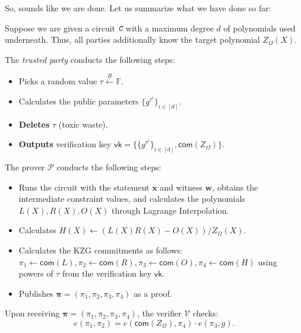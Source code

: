 \documentclass[../lecture-notes.tex]{subfiles}
\begin{document}
So, sounds like we are done. Let us summarize what we have done so far:
\begin{tcolorbox}[title=Attempt \#1 zk-SNARK Protocol,
    colback=blue!5!white,
    colframe=blue!75!black,
    colbacktitle=blue!25!white,
    coltitle=blue!20!black,
    fonttitle=\bfseries,
    boxrule=1.25pt,
    subtitle style={boxrule=0pt,
    colback=blue!20!white,
    colupper=blue!75!gray} ]

    Suppose we are given a circuit $\textit{\texttt{C}}$ with a maximum degree $d$ of polynomials used underneath. Thus, all parties additionally know the target polynomial $Z_{\Omega}(X)$.

    The \emph{trusted party} conducts the following steps:
    \begin{itemize}
        \item Picks a random value $\tau \xleftarrow{R} \mathbb{F}$.
        \item Calculates the public parameters $\{g^{\tau^i}\}_{i \in [d]}$.
        \item \textcolor{red!80!black}{\textbf{Deletes}} $\tau$ (toxic waste).
        \item \textbf{Outputs} verification key $\mathsf{vk} = \{\{g^{\tau^i}\}_{i \in [d]}, \mathsf{com}(Z_{\Omega})\}$.
    \end{itemize}
    The prover $\mathcal{P}$ conducts the following steps:
    \begin{itemize}
        \item Runs the circuit with the statement $\mathbf{x}$ and witness $\mathbf{w}$, obtains the intermediate constraint values, and calculates the polynomials $L(X), R(X), O(X)$ through Lagrange Interpolation.
        \item Calculates $H(X) \gets (L(X)R(X) - O(X))\big/ Z_{\Omega}(X)$.
        \item Calculates the KZG commitments as follows: $\pi_1 \gets \mathsf{com}(L), \pi_2 \gets \mathsf{com}(R), \pi_3 \gets \mathsf{com}(O), \pi_4 \gets \mathsf{com}(H)$ using powers of $\tau$ from the verification key $\mathsf{vk}$.
        \item Publishes $\boldsymbol{\pi} = (\pi_1,\pi_2,\pi_3,\pi_4)$ as a proof.
    \end{itemize}
    Upon receiving $\boldsymbol{\pi} = (\pi_1,\pi_2,\pi_3,\pi_4)$, the verifier $\mathcal{V}$ checks:
    \begin{equation*}
        e(\pi_1, \pi_2) = e(\mathsf{com}(Z_{\Omega}), \pi_4) \cdot e(\pi_3, g).
    \end{equation*}
\end{tcolorbox}
\end{document}

